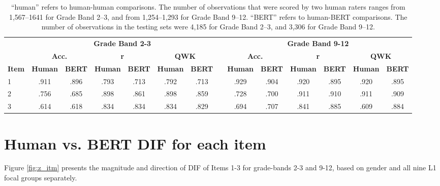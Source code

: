 \documentclass [PhD] {uclathes}
\begin{document}
\begin{table}[ht]
\centering
\small  %
\begin{tabular}{lccccccccccccc}
\toprule
    & \multicolumn{6}{c}{\textbf{Grade Band 2-3}} & \multicolumn{1}{c}{ } & \multicolumn{6}{c}{\textbf{Grade Band 9-12}} \\
    \cline{2-7}
    \cline{9-14}
    & \multicolumn{2}{c}{\textbf{Acc.}} & \multicolumn{2}{c}{\textbf{r}} & \multicolumn{2}{c}{\textbf{QWK}} & \multicolumn{1}{c}{ } & \multicolumn{2}{c}{\textbf{Acc.}} & \multicolumn{2}{c}{\textbf{r}} & \multicolumn{2}{c}{\textbf{QWK}} \\
    \textbf{Item} & \textbf{Human} & \textbf{BERT} & \textbf{Human} & \textbf{BERT} & \textbf{Human} & \textbf{BERT} & & \textbf{Human} & \textbf{BERT} & \textbf{Human} & \textbf{BERT} & \textbf{Human} & \textbf{BERT} \\
    \midrule
    1 & .911 & .896 & .793 & .713 & .792 & .713 & & .929 & .904 & .920 & .895 & .920 & .895 \\
    2 & .756 & .685 & .898 & .861 & .898 & .859 & & .728 & .700 & .911 & .910 & .911 & .909 \\
    3 & .614 & .618 & .834 & .834 & .834 & .829 & & .694 & .707 & .841 & .885 & .609 & .884 \\
    \bottomrule
    \end{tabular}
\caption{\label{bert_perf}
 “human” refers to human-human comparisons. The number of observations that were scored by two human raters ranges from 1,567–1641 for Grade Band 2–3, and from 1,254–1,293 for Grade Band 9–12. “BERT” refers to human-BERT comparisons. The number of observations in the testing sets were 4,185 for Grade Band 2–3, and 3,306 for Grade Band 9–12.}
\end{table}

\section{Human vs. BERT DIF for each item}
\label{sec:appendix_z_itm}

Figure \ref{fig:z_itm} presents the magnitude and direction of DIF of Items 1-3 for grade-bands 2-3 and 9-12, based on gender and all nine L1 focal groups separately.
\end{document}
